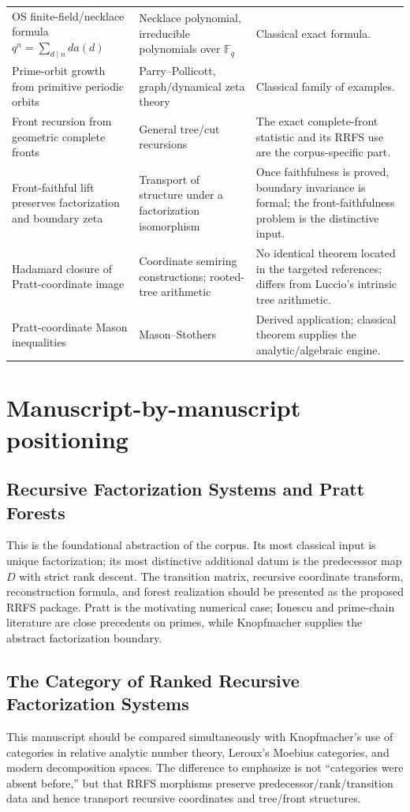 \documentclass[11pt]{article}
\newcommand{\FF}{\mathbb F}
\begin{document}
\begin{longtable}{>{\raggedright\arraybackslash}p{}>{\raggedright\arraybackslash}p{}>{\raggedright\arraybackslash}p{}}
OS finite-field/necklace formula $q^n=\sum_{d\mid n}d a(d)$ & Necklace polynomial, irreducible polynomials over $\FF_q$ & Classical exact formula.\\
Prime-orbit growth from primitive periodic orbits & Parry--Pollicott, graph/dynamical zeta theory & Classical family of examples.\\
Front recursion from geometric complete fronts & General tree/cut recursions & The exact complete-front statistic and its RRFS use are the corpus-specific part.\\
Front-faithful lift preserves factorization and boundary zeta & Transport of structure under a factorization isomorphism & Once faithfulness is proved, boundary invariance is formal; the front-faithfulness problem is the distinctive input.\\
Hadamard closure of Pratt-coordinate image & Coordinate semiring constructions; rooted-tree arithmetic & No identical theorem located in the targeted references; differs from Luccio's intrinsic tree arithmetic.\\
Pratt-coordinate Mason inequalities & Mason--Stothers & Derived application; classical theorem supplies the analytic/algebraic engine.\\
\bottomrule
\end{longtable}
\normalsize

\section{Manuscript-by-manuscript positioning}
\subsection{Recursive Factorization Systems and Pratt Forests}
This is the foundational abstraction of the corpus. Its most classical input is unique factorization; its most distinctive additional datum is the predecessor map $D$ with strict rank descent. The transition matrix, recursive coordinate transform, reconstruction formula, and forest realization should be presented as the proposed RRFS package. Pratt is the motivating numerical case; Ionescu and prime-chain literature are close precedents on primes, while Knopfmacher supplies the abstract factorization boundary.

\subsection{The Category of Ranked Recursive Factorization Systems}
This manuscript should be compared simultaneously with Knopfmacher's use of categories in relative analytic number theory, Leroux's Moebius categories, and modern decomposition spaces. The difference to emphasize is not ``categories were absent before,'' but that RRFS morphisms preserve predecessor/rank/transition data and hence transport recursive coordinates and tree/front structures.
\end{document}
